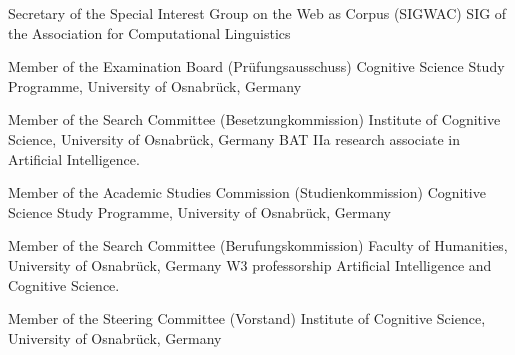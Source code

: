 
        {Secretary of the Special Interest Group on the Web as Corpus (SIGWAC)}
        {}
        {SIG of the Association for Computational Linguistics}
        {}
        {}

        {Member of the Examination Board (Pr\"{u}fungsausschuss)}
        {}
        {Cognitive Science Study Programme, University of Osnabr\"{u}ck, Germany}
        {}
        {}

        {Member of the Search Committee (Besetzungkommission)}
        {}
        {Institute of Cognitive Science, University of Osnabr\"{u}ck, Germany}
        {}
        {BAT IIa research associate in Artificial Intelligence.}

        {Member of the Academic Studies Commission (Studienkommission)}
        {}
        {Cognitive Science Study Programme, University of Osnabr\"{u}ck, Germany}
        {}
        {}

        {Member of the Search Committee (Berufungskommission)}
        {}
        {Faculty of Humanities, University of Osnabr\"{u}ck, Germany}
        {}
        {W3 professorship Artificial Intelligence and Cognitive Science.}

        {Member of the Steering Committee (Vorstand)}
        {}
        {Institute of Cognitive Science, University of Osnabr\"{u}ck, Germany}
        {}
        {}


